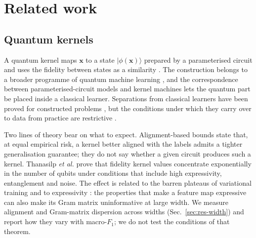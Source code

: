 \section{Related work}\label{sec:related}

\subsection{Quantum kernels}

A quantum kernel maps $\bm{x}$ to a state $|\phi(\bm{x})\rangle$ prepared by a parameterised
circuit and uses the fidelity between states as a similarity \cite{havlicek2019,schuld2019}.
The construction belongs to a broader programme of quantum machine learning
\cite{ref5,ref6,ref7}, and the correspondence between parameterised-circuit models and kernel
machines \cite{ref9} lets the quantum part be placed inside a classical learner. Separations
from classical learners have been proved for constructed problems \cite{ref18}, but the
conditions under which they carry over to data from practice are restrictive \cite{ref19,ref20}.

Two lines of theory bear on what to expect. Alignment-based bounds \cite{cristianini2002,cortes2012}
state that, at equal empirical risk, a kernel better aligned with the labels admits a tighter
generalisation guarantee; they do not say whether a given circuit produces such a kernel.
Thanasilp \emph{et al.} \cite{thanasilp2024} prove that fidelity kernel values concentrate
exponentially in the number of qubits under conditions that include high expressivity,
entanglement and noise. The effect is related to the barren plateaus of variational training
\cite{ref10} and to expressivity \cite{ref21}: the properties that make a feature map
expressive can also make its Gram matrix uninformative at large width. We measure alignment
and Gram-matrix dispersion across widths (Sec.~\ref{sec:res-width}) and report how they vary
with macro-$F_1$; we do not test the conditions of that theorem.


